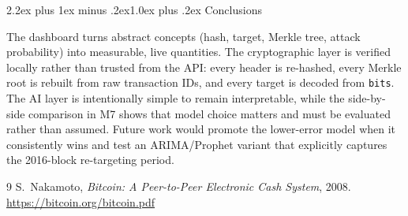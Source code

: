 \documentclass[11pt,a4paper]{article}
\makeatletter
\renewcommand{\section}{\@startsection{section}{1}{0pt}%
  {2.2ex plus 1ex minus .2ex}{1.0ex plus .2ex}%
  {\color{btcgreen}\large\bfseries\sffamily}}
\makeatother
\begin{document}
\section{Conclusions}

The dashboard turns abstract concepts (hash, target, Merkle tree, attack
probability) into measurable, live quantities. The cryptographic layer is
verified locally rather than trusted from the API: every header is
re-hashed, every Merkle root is rebuilt from raw transaction IDs, and every
target is decoded from \texttt{bits}. The AI layer is intentionally simple to
remain interpretable, while the side-by-side comparison in M7 shows that model
choice matters and must be evaluated rather than assumed. Future work would
promote the lower-error model when it consistently wins and test an
ARIMA/Prophet variant that explicitly captures the 2016-block re-targeting
period.

\begin{thebibliography}{9}
\small
{}
S.~Nakamoto, \emph{Bitcoin: A Peer-to-Peer Electronic Cash System}, 2008.\\
\url{https://bitcoin.org/bitcoin.pdf}
\end{thebibliography}
\end{document}
